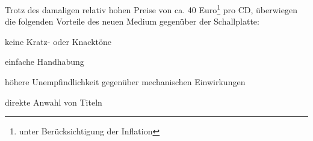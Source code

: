 Trotz des damaligen relativ hohen Preise von ca. 40 Euro\footnote{unter
Berücksichtigung der Inflation} pro CD, überwiegen die folgenden Vorteile des
neuen Medium gegenüber der Schallplatte: \cite{cd1}

\begin{itemize*}
    \item keine Kratz- oder Knacktöne
    \item einfache Handhabung
    \item höhere Unempfindlichkeit gegenüber mechanischen Einwirkungen
    \item direkte Anwahl von Titeln
\end{itemize*}
